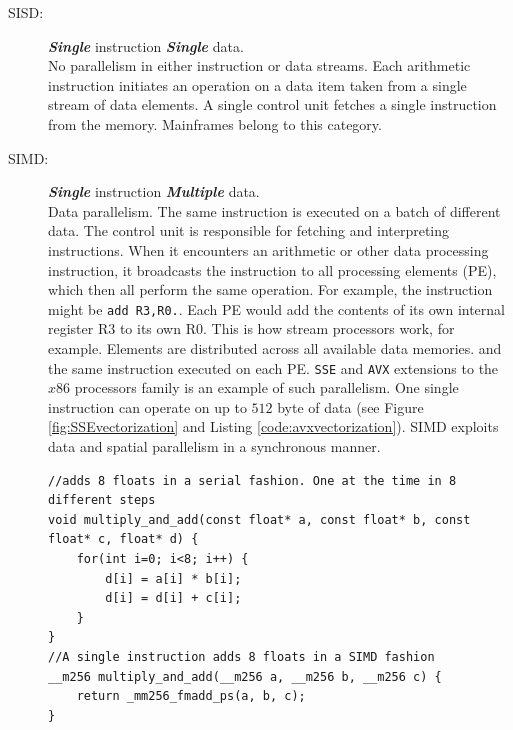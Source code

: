 \begin{description}


\item[SISD:] \textit{\textbf{Single}} instruction \textit{\textbf{Single}}
data.\hfill\\
No parallelism in either instruction or data streams. Each arithmetic
instruction initiates an operation on a data item taken from a single stream of data elements. A single control unit fetches a single instruction from the memory. Mainframes belong to this category.
\item[SIMD:] \textit{\textbf{Single}} instruction
\textit{\textbf{Multiple}} data. \hfill \\ Data parallelism. The same
instruction is executed on a batch of different data. The control unit is
responsible for fetching and interpreting instructions. When it encounters an
arithmetic or other data processing instruction, it broadcasts the instruction
to all processing elements (PE), which then all perform the same operation. For
example, the instruction might be \texttt{add R3,R0.}. Each PE would add the
contents of its own internal register R3 to its own R0. This is how stream
processors work, for example. Elements are distributed across all available data memories. and the same instruction executed on each PE. \texttt{SSE} and \texttt{AVX} extensions to the $x86$ processors family is an example of such parallelism. One single instruction can operate on up to $512$ byte of data (see Figure \ref{fig:SSEvectorization} and Listing \ref{code:avxvectorization}). SIMD exploits data and spatial parallelism in a synchronous manner.

\begin{lstlisting}
//adds 8 floats in a serial fashion. One at the time in 8 different steps
void multiply_and_add(const float* a, const float* b, const float* c, float* d) {  
	for(int i=0; i<8; i++) {
		d[i] = a[i] * b[i];
		d[i] = d[i] + c[i];
	}
}
//A single instruction adds 8 floats in a SIMD fashion
__m256 multiply_and_add(__m256 a, __m256 b, __m256 c) {
	return _mm256_fmadd_ps(a, b, c);
}
\end{lstlisting}


\end{description}
